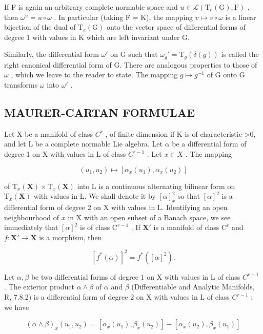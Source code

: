 If F is again an arbitrary complete normable space and \(u \in \mathcal{L}(\mathrm{T}_{e}(\mathrm{G}), \mathrm{F})\) , then \(\omega^{u} = u \circ \omega\) . In particular (taking F = K), the mapping \(v \mapsto v \circ \omega\) is a linear bijection of the dual of \(\mathrm{T}_{e}(\mathrm{G})\) onto the vector space of differential forms of degree 1 with values in K which are left invariant under G.

Similarly, the differential form \(\omega'\) on G such that \(\omega_g' = \mathrm{T}_g(\delta(g))\) is called the right canonical differential form of G. There are analogous properties to those of \(\omega\) , which we leave to the reader to state. The mapping \(g \mapsto g^{-1}\) of G onto G transforms \(\omega\) into \(\omega'\) .

\subsection{MAURER-CARTAN FORMULAE}

Let X be a manifold of class \(C^{r}\) , of finite dimension if K is of characteristic \textgreater0, and let L be a complete normable Lie algebra. Let \(\alpha\) be a differential form of degree 1 on X with values in L of class \(C^{r-1}\) . Let \(x \in X\) . The mapping

\[
(u _ {1}, u _ {2}) \mapsto [ \alpha_ {x} (u _ {1}), \alpha_ {x} (u _ {2}) ]
\]

of \(\mathrm{T}_x(\mathbf{X})\times \mathrm{T}_x(\mathbf{X})\) into L is a continuous alternating bilinear form on \(\mathrm{T}_x(\mathbf{X})\) with values in L. We shall denote it by \([\alpha ]_x^2\) so that \([\alpha ]^2\) is a differential form of degree 2 on X with values in L. Identifying an open neighbourhood of \(x\) in X with an open subset of a Banach space, we see immediately that \([\alpha ]^2\) is of class \(\mathrm{C}^{r - 1}\) . If \(\mathbf{X}'\) is a manifold of class \(\mathrm{C}^r\) and \(f\colon \mathbf{X}'\to \mathbf{X}\) is a morphism, then

\[
[ f ^ {*} (\alpha) ] ^ {2} = f ^ {*} ([ \alpha ] ^ {2}).\tag{28}
\]

Let \(\alpha, \beta\) be two differential forms of degree 1 on X with values in L of class \(C^{r-1}\) . The exterior product \(\alpha \wedge \beta\) of \(\alpha\) and \(\beta\) (Differentiable and Analytic Manifolds, R, 7.8.2) is a differential form of degree 2 on X with values in L of class \(C^{r-1}\) ; we have

\[
(\alpha \wedge \beta) _ {x} (u _ {1}, u _ {2}) = [ \alpha_ {x} (u _ {1}), \beta_ {x} (u _ {2}) ] - [ \alpha_ {x} (u _ {2}), \beta_ {x} (u _ {1}) ]\tag{29}
\]

